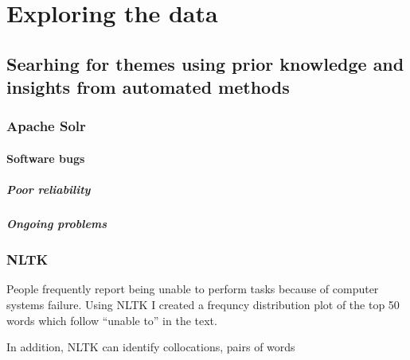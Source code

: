 \chapter{Exploring the data}

\section{Searhing for themes using prior knowledge and insights from automated methods}

\subsection{Apache Solr}

\subsubsection{Software bugs}

\paragraph{Poor reliability}

\paragraph{Ongoing problems}

\subsection{NLTK}

People frequently report being unable to perform tasks because of computer systems failure. Using NLTK I created a frequncy distribution plot of the top 50 words which follow ``unable to'' in the text. 

In addition, NLTK can identify collocations, pairs of words

